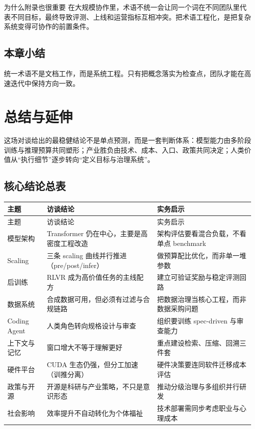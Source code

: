 \documentclass[a4paper]{article}
\begin{document}
\begin{knowledgebox}{为什么附录也很重要}
在大规模协作里，术语不统一会让同一个词在不同团队里代表不同目标，最终导致评测、上线和运营指标互相冲突。把术语工程化，是把复杂系统变得可协作的前置条件。
\end{knowledgebox}

\subsection{本章小结}

统一术语不是文档工作，而是系统工程。只有把概念落实为检查点，团队才能在高速迭代中保持方向一致。

\section{总结与延伸}

这场对谈给出的最稳健结论不是单点预测，而是一套判断体系：模型能力由多阶段训练与推理预算共同塑形；产业胜负由技术、成本、入口、政策共同决定；人类价值从“执行细节”逐步转向“定义目标与治理系统”。

\subsection{核心结论总表}

\begin{longtable}{p{}p{}p{}}
\toprule
主题 & 访谈结论 & 实务启示 \\
\midrule
\endfirsthead
\toprule
主题 & 访谈结论 & 实务启示 \\
\midrule
\endhead
模型架构 & Transformer 仍在中心，主要是高密度工程改造 & 架构评估要看混合负载，不看单点 benchmark \\
Scaling & 三条 scaling 曲线并行推进（pre/post/infer） & 做预算配比优化，而非单一堆参数 \\
后训练 & RLVR 成为高价值任务的主线配方 & 建立可验证奖励与稳定评测回路 \\
数据系统 & 合成数据可用，但必须有过滤与合规链路 & 把数据治理当核心工程，而非数据采购问题 \\
Coding Agent & 人类角色转向规格设计与审查 & 组织要训练 spec-driven 与审查能力 \\
上下文与记忆 & 窗口增大不等于理解更好 & 重点建设检索、压缩、回溯三件套 \\
硬件平台 & CUDA 生态仍强，但分工加速（训推分离） & 硬件决策要连同软件迁移成本评估 \\
政策与开源 & 开源是科研与产业策略，不只是意识形态 & 推动分级治理与多组织并行研发 \\
社会影响 & 效率提升不自动转化为个体福祉 & 技术部署需同步考虑职业与心理成本 \\
\bottomrule
\end{longtable}
\end{document}
